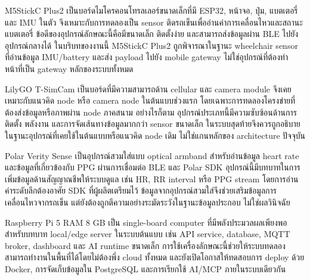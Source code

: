M5StickC Plus2 เป็นบอร์ดไมโครคอนโทรลเลอร์ขนาดเล็กที่มี ESP32, หน้าจอ, ปุ่ม, แบตเตอรี่ และ IMU ในตัว จึงเหมาะกับการทดลองเป็น sensor ติดรถเข็นเพื่ออ่านค่าการเคลื่อนไหวและสถานะแบตเตอรี่ ข้อดีของอุปกรณ์ลักษณะนี้คือมีขนาดเล็ก ติดตั้งง่าย และสามารถส่งข้อมูลผ่าน BLE ไปยังอุปกรณ์กลางได้ ในบริบทของงานนี้ M5StickC Plus2 ถูกพิจารณาในฐานะ wheelchair sensor ที่อ่านข้อมูล IMU/battery และส่ง payload ไปยัง mobile gateway ไม่ใช่อุปกรณ์ที่ต้องทำหน้าที่เป็น gateway หลักของระบบทั้งหมด \cite{M5StickCPlus2Docs}

LilyGO T-SimCam เป็นบอร์ดที่มีความสามารถด้าน cellular และ camera module จึงเคยเหมาะกับแนวคิด node หรือ camera node ในต้นแบบช่วงแรก โดยเฉพาะการทดลองโครงข่ายที่ต้องส่งข้อมูลหรือภาพผ่าน node ภาคสนาม อย่างไรก็ตาม อุปกรณ์ประเภทนี้มีความซับซ้อนด้านการติดตั้ง พลังงาน และการจัดเส้นทางข้อมูลมากกว่า sensor ขนาดเล็ก ในระบบสุดท้ายจึงควรถูกอธิบายในฐานะอุปกรณ์ที่เคยใช้ในต้นแบบหรือแนวคิด node เดิม ไม่ใช่แกนหลักของ architecture ปัจจุบัน \cite{LilygoTSimCamDocs}

Polar Verity Sense เป็นอุปกรณ์สวมใส่แบบ optical armband สำหรับอ่านข้อมูล heart rate และข้อมูลที่เกี่ยวข้องกับ PPG ผ่านการเชื่อมต่อ BLE และ Polar SDK อุปกรณ์นี้มีบทบาทในการเพิ่มข้อมูลด้านสัญญาณชีพให้ระบบดูแล เช่น HR, RR interval หรือ PPG stream โดยการอ่านค่าระดับลึกต้องอาศัย SDK ที่ผู้ผลิตเตรียมไว้ ข้อมูลจากอุปกรณ์สวมใส่จึงช่วยเสริมข้อมูลการเคลื่อนไหวจากรถเข็น แต่ยังต้องถูกตีความอย่างระมัดระวังในฐานะข้อมูลประกอบ ไม่ใช่ผลวินิจฉัย \cite{Polar_VeritySense_Spec,PolarBLESDK}

Raspberry Pi 5 RAM 8 GB เป็น single-board computer ที่มีพลังประมวลผลเพียงพอสำหรับบทบาท local/edge server ในระบบต้นแบบ เช่น API service, database, MQTT broker, dashboard และ AI runtime ขนาดเล็ก การใช้เครื่องลักษณะนี้ช่วยให้ระบบทดลองสามารถทำงานในพื้นที่ได้โดยไม่ต้องพึ่ง cloud ทั้งหมด และยังเปิดโอกาสให้ทดสอบการ deploy ด้วย Docker, การจัดเก็บข้อมูลใน PostgreSQL และการเรียกใช้ AI/MCP ภายในระบบเดียวกัน \cite{RaspberryPi5Specs}

